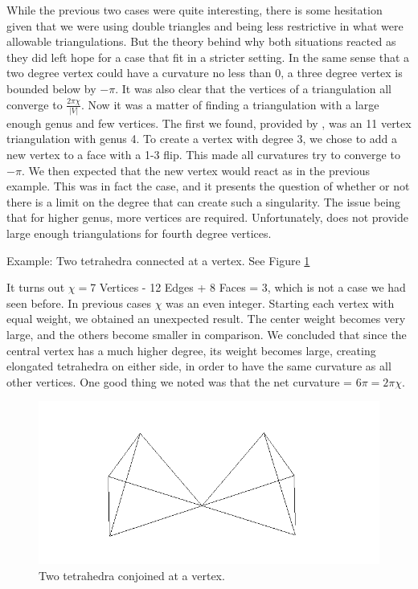 \documentclass[12pt]{article}
\begin{document}
\noindent While the previous two cases were quite interesting, there is some hesitation given that we were using double triangles and being less restrictive in what were allowable triangulations. But the theory behind why both situations reacted as they did left hope for a case that fit in a stricter setting. In the same sense that a two degree vertex could have a curvature no less than 0, a three degree vertex is bounded below by $-\pi$. It was also clear that the vertices of a triangulation all converge to $\displaystyle\frac{2\pi\chi}{|V|}$. Now it was a matter of finding a triangulation with a large enough genus and few vertices. The first we found, provided by \cite{lutzmanifold}, was an 11 vertex triangulation with genus 4. To create a vertex with degree 3, we chose to add a new vertex to a face with a 1-3 flip. This made all curvatures try to converge to $-\pi$. We then expected that the new vertex would react as in the previous example. This was in fact the case, and it presents the question of whether or not there is a limit on the degree that can create such a singularity. The issue being that for higher genus, more vertices are required. Unfortunately, \cite{lutzmanifold} does not provide large enough triangulations for fourth degree vertices.\newline

\noindent Example: Two tetrahedra connected at a vertex. See Figure \ref{fig:tt}\newline

\noindent It turns out $\chi = $7 Vertices - 12 Edges + 8 Faces = 3, which is not a case we had seen before. In previous cases $\chi$ was an even integer. Starting each vertex with equal weight, we obtained an unexpected result. The center weight becomes very large, and the others become smaller in comparison. We concluded that since the central vertex has a much higher degree, its weight becomes large, creating elongated tetrahedra on either side, in order to have the same curvature as all other vertices. One good thing we noted was that the net curvature = $6\pi = 2\pi\chi$.  

\begin{figure}
\includegraphics{tetratouch.png}
\caption{Two tetrahedra conjoined at a vertex.}
\label{fig:tt}
\end{figure}
\end{document}
